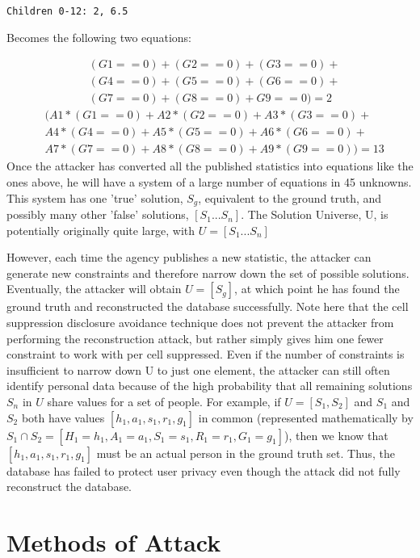 \documentclass[jou,apacite]{apa6}
\begin{document}
\begin{verbatim}
Children 0-12: 2, 6.5
\end{verbatim}

Becomes the following two equations:

\begin{align*}
& (G1==0) + (G2==0) + (G3==0)+\\
& (G4==0)+  (G5==0) + (G6==0) +\\
& (G7==0) + (G8==0) + G9==0) = 2
\end{align*}
\begin{align*}
& (A1 * (G1==0) + A2 * (G2==0) + A3 * (G3==0) +\\
& A4 * (G4==0) +  A5 * (G5==0) + A6 * (G6==0) + \\
& A7 * (G7==0) + A8 * (G8==0) + A9 * (G9==0)) = 13
\end{align*}
Once the attacker has converted all the published statistics
into equations like the ones above, he will have a system
of a large number of equations in 45 unknowns. This system has one 'true' solution, $S_g$, equivalent to the
ground truth, and possibly many other 'false' solutions, $[S_1...S_n]$.
The Solution Universe, U, is potentially originally quite large, with $U = [S_1...S_n]$

However, each time the agency publishes a new statistic, the attacker
can generate new constraints and therefore narrow
down the set of possible solutions. Eventually, the attacker
will obtain $U = [S_g]$, at which point he has
found the ground truth and reconstructed the database
successfully. Note here that the cell suppression disclosure avoidance technique does not prevent the attacker from performing the reconstruction attack, but rather simply gives him one fewer constraint to work with per cell suppressed.
Even if the number of constraints is insufficient to narrow down U to just one element, the attacker can still often identify personal data because of the high probability that all remaining solutions $S_n$ in $U$ share values for a set of people. For example, if
$U = [S_1, S_2]$ and $S_1$ and $S_2$ both have values $[h_1, a_1, s_1, r_1, g_1]$ in common
(represented mathematically by $S_1 \cap S_2 = [H_1=h_1, A_1=a_1, S_1=s_1, R_1=r_1, G_1=g_1]$),
then we know that $[h_1, a_1, s_1, r_1, g_1]$ must be an actual person in the ground truth set. Thus, the database has failed to protect user privacy even though the attack did not fully reconstruct the database.

\section{Methods of Attack}
\end{document}
